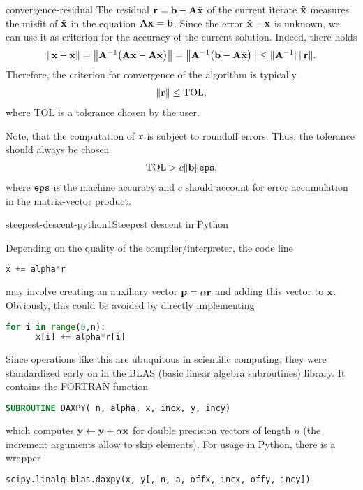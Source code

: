\begin{Remark}{convergence-residual}
  The residual $\vr = \vb - \mata\tilde\vx$ of the current iterate
  $\tilde\vx$ measures the misfit of $\tilde\vx$ in the equation
  $\mata\vx = \vb$. Since the error $\tilde\vx-\vx$ is unknown, we can
  use it as criterion for the accuracy of the current
  solution. Indeed, there holds
  \begin{gather}
    \norm{\vx-\tilde\vx}
    = \norm*{\mata^{-1}\bigl(\mata\vx - \mata\tilde\vx\bigr)}
    = \norm*{\mata^{-1}\bigl(\vb - \mata\tilde\vx\bigr)}
    \le \norm{\mata^{-1}}\norm{\vr}.
  \end{gather}
  Therefore, the criterion for convergence of the algorithm is typically
  \begin{gather}
    \norm{\vr} \le \text{TOL},
  \end{gather}
  where TOL is a tolerance chosen by the user.

  Note, that the computation of $\vr$ is subject to roundoff
  errors. Thus, the tolerance should always be chosen
  \begin{gather}
    \text{TOL} > c\norm{\vb}\eps,
  \end{gather}
  where $\eps$ is the machine accuracy and $c$ should account for
  error accumulation in the matrix-vector product.
\end{Remark}

\begin{Algorithm*}{steepest-descent-python1}{Steepest descent in Python}
  
\end{Algorithm*}

\begin{remark}
  Depending on the quality of the compiler/interpreter, the code line
  \begin{lstlisting}[language=Python,numbers=none]
    x += alpha*r
  \end{lstlisting}
  may involve creating an auxiliary vector $\vp = \alpha \vr$ and
  adding this vector to $\vx$.  Obviously, this could be avoided by
  directly implementing
  \begin{lstlisting}[language=Python,numbers=none]
    for i in range(0,n):
      x[i] += alpha*r[i]
  \end{lstlisting}
  Since operations like this are ubuquitous in scientific computing,
  they were standardized early on in the BLAS (basic linear algebra
  subroutines) library. It contains the FORTRAN function
  \begin{lstlisting}[language=Fortran,numbers=none]
    SUBROUTINE DAXPY( n, alpha, x, incx, y, incy)
  \end{lstlisting}
  which computes $\vy\gets\vy+\alpha\vx$ for double precision vectors
  of length $n$ (the increment arguments allow to skip elements). For
  usage in Python, there is a wrapper
  \begin{lstlisting}[language=Python,numbers=none]
    scipy.linalg.blas.daxpy(x, y[, n, a, offx, incx, offy, incy])
  \end{lstlisting}
\end{remark}

